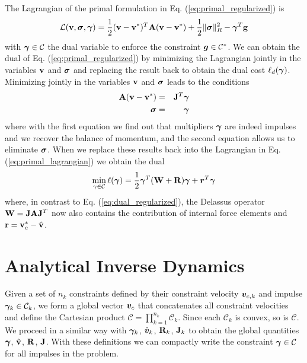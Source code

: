 

The Lagrangian of the primal formulation in Eq. (\ref{eq:primal_regularized}) is
\begin{equation}
	\mathcal{L}(\mf{v},\bsigma,\vf{\gamma}) = \frac{1}{2}(\mf{v}-\mf{v}^*)^T\mf{A}(\mf{v}-\mf{v}^*) + \frac{1}{2} \Vert\bsigma\Vert_{R}^2 - \vf{\gamma}^T\mf{g}
	\label{eq:primal_lagrangian}
\end{equation}
with ${\bm{\gamma}}\in\mathcal{C}$ the dual variable to enforce the constraint
${\bm{g}}\in \mathcal{C}^*$. We can obtain the dual of Eq.
(\ref{eq:primal_regularized}) by minimizing the Lagrangian jointly in the
variables ${\mathbf{v}}$ and ${\bm\sigma}$ and replacing the result back to obtain the
dual cost $\ell_d({\bm{\gamma}})$. Minimizing jointly in the variables ${\mathbf{v}}$
and ${\bm\sigma}$ leads to the conditions
\begin{eqnarray}
	{\mathbf{A}}({\mathbf{v}}-{\mathbf{v}}^*) &=& {\mathbf{J}}^T{\bm{\gamma}}\\
	{\bm{\sigma}} &=& {\bm{\gamma}}
\end{eqnarray}
where with the first equation we find out that multipliers ${\bm\gamma}$ are indeed
impulses and we recover the balance of momentum, and the second equation allows
us to eliminate ${\bm{\sigma}}$. When we replace these results back into the
Lagrangian in Eq. (\ref{eq:primal_lagrangian}) we obtain the dual
\begin{eqnarray}
	\min_{\gamma\in \mathcal{C}} \ell({\bm\gamma}) =
	\frac{1}{2}{\bm\gamma}^T(\mathbf{W}+\mathbf{R}){\bm\gamma} + {\bm r}^T
	{\bm\gamma}
\end{eqnarray}
where, in contrast to Eq. (\ref{eq:dual_regularized}), the Delassus operator
${\mathbf{W}}={\mathbf{J}}{\mathbf{A}}{\mathbf{J}}^T$ now also contains the contribution of internal
force elements and ${\mathbf{r}}={\mathbf{v}}_c^*-\hat{{\mathbf{v}}}$.

\section{Analytical Inverse Dynamics}
\label{sec:analytical_inverse_dynamics}

Given a set of $n_k$ constraints defined by their constraint velocity
${\bm{v}}_{c,k}$ and impulse ${\bm\gamma}_k\in\mathcal{C}_k$, we form a global vector
${\bm{v}}_c$ that concatenates all constraint velocities and define the Cartesian
product $\mathcal{C}=\prod_{k=1}^{n_k}\mathcal{C}_k$. Since each $\mathcal{C}_k$
is convex, so is $\mathcal{C}$. We proceed in a similar way with ${\bm\gamma}_k$,
$\hat{{\bm{v}}}_k$, ${\mathbf{R}}_k$, ${\mathbf{J}}_k$ to obtain the global quantities
${\bm\gamma}$, $\hat{{\mathbf{v}}}$, ${\mathbf{R}}$, ${\mathbf{J}}$. With these definitions we can
compactly write the constraint ${\bm\gamma}\in\mathcal{C}$ for all impulses in the
problem.


